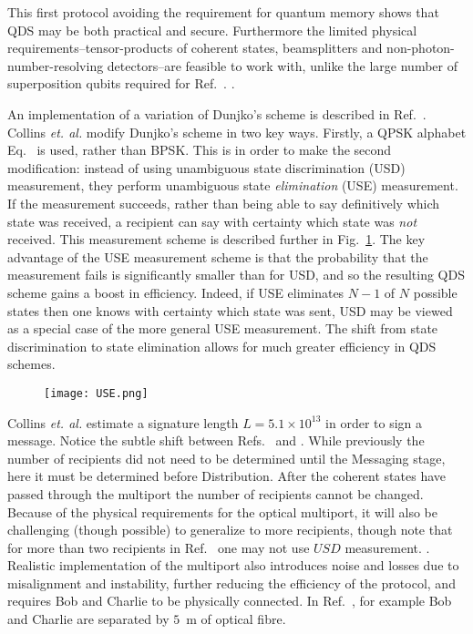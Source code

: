 This first protocol avoiding the requirement for quantum memory shows that QDS may be both practical and secure. Furthermore the limited physical requirements--tensor-products of coherent states, beamsplitters and non-photon-number-resolving detectors--are feasible to work with, unlike the large number of superposition qubits required for Ref.~\cite{Gottesman2001}. . 

An implementation of a variation of Dunjko's scheme is described in Ref.~\cite{Collins2014}. Collins \emph{et. al.} modify Dunjko's scheme in two key ways. Firstly, a QPSK alphabet Eq.~ is used, rather than BPSK. This is in order to make the second modification: instead of using unambiguous state discrimination (USD) measurement, they perform unambiguous state \emph{elimination} (USE) measurement. If the measurement succeeds, rather than being able to say definitively which state was received, a recipient can say with certainty which state was \emph{not} received. This measurement scheme is described further in Fig.~\ref{fig:USE}. The key advantage of the USE measurement scheme is that the probability that the measurement fails is significantly smaller than for USD, and so the resulting QDS scheme gains a boost in efficiency. Indeed, if USE eliminates $N-1$ of $N$ possible states then one knows with certainty which state was sent, USD may be viewed as a special case of the more general USE measurement. The shift from state discrimination to state elimination allows for much greater efficiency in QDS schemes. 

\begin{figure}[htp]
\centering
\texttt{[image: USE.png]}
\caption{\label{fig:USE}}
\end{figure}

Collins \emph{et. al.} estimate a signature length $L = 5.1 \times 10^{13}$ in order to sign a message. Notice the subtle shift between Refs.~\cite{Gottesman2001} and \cite{Andersson2006, Clarke2012, Dunjko2014, Collins2014}. While previously the number of recipients did not need to be determined until the Messaging stage, here it must be determined before Distribution. After the coherent states have passed through the multiport the number of recipients cannot be changed. 
 Because of the physical requirements for the optical multiport, it will also be challenging (though possible) to generalize to more recipients, though note that for more than two recipients in Ref.~\cite{Dunjko2014} one may not use $USD$ measurement. . Realistic implementation of the multiport also introduces noise and losses due to misalignment and instability, further reducing the efficiency of the protocol, and requires Bob and Charlie to be physically connected. In Ref.~\cite{Clarke2012, Collins2014}, for example Bob and Charlie are separated by $5$~m of optical fibre. 

